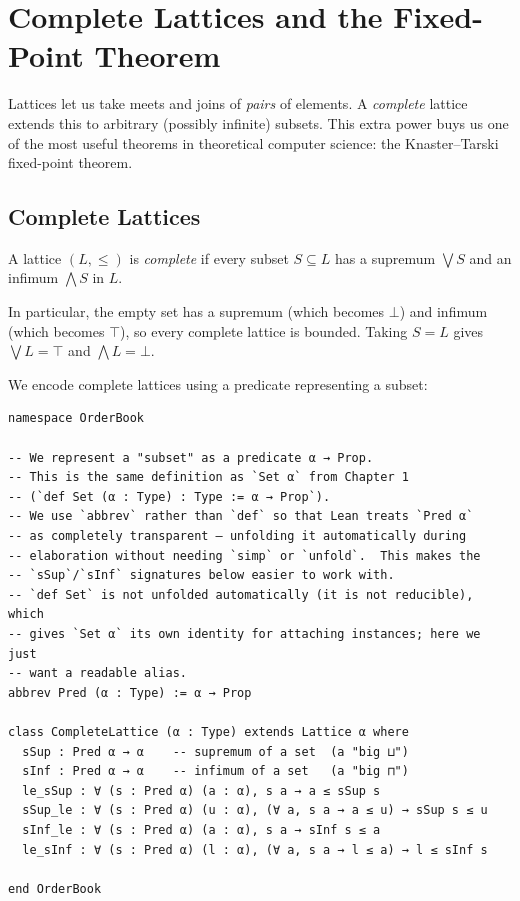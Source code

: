 \documentclass[12pt, a4paper, openright]{book}
\theoremstyle{thmstyle}
\theoremstyle{defstyle}
\newenvironment{defbox}[1][]{%
  \begin{tcolorbox}[defbox, title={Definition\ifx\\#1\\\else\ --- #1\fi}]%
}{\end{tcolorbox}}
\newenvironment{notebox}{%
  \begin{tcolorbox}[notebox]%
}{\end{tcolorbox}}
\begin{document}
\chapter{Complete Lattices and the Fixed-Point Theorem}

Lattices let us take meets and joins of \emph{pairs} of elements. A
\emph{complete} lattice extends this to arbitrary (possibly infinite) subsets.
This extra power buys us one of the most useful theorems in theoretical
computer science: the Knaster--Tarski fixed-point theorem.

\section{Complete Lattices}

\begin{defbox}[Complete Lattice]
  A lattice $(L, \leq)$ is \emph{complete} if every subset $S \subseteq L$
  has a supremum $\bigvee S$ and an infimum $\bigwedge S$ in $L$.
\end{defbox}

\begin{notebox}
  In particular, the empty set has a supremum (which becomes $\bot$) and
  infimum (which becomes $\top$), so every complete lattice is bounded.
  Taking $S = L$ gives $\bigvee L = \top$ and $\bigwedge L = \bot$.
\end{notebox}

We encode complete lattices using a predicate representing a subset:

\begin{verbatim}
namespace OrderBook

-- We represent a "subset" as a predicate α → Prop.
-- This is the same definition as `Set α` from Chapter 1
-- (`def Set (α : Type) : Type := α → Prop`).
-- We use `abbrev` rather than `def` so that Lean treats `Pred α`
-- as completely transparent — unfolding it automatically during
-- elaboration without needing `simp` or `unfold`.  This makes the
-- `sSup`/`sInf` signatures below easier to work with.
-- `def Set` is not unfolded automatically (it is not reducible), which
-- gives `Set α` its own identity for attaching instances; here we just
-- want a readable alias.
abbrev Pred (α : Type) := α → Prop

class CompleteLattice (α : Type) extends Lattice α where
  sSup : Pred α → α    -- supremum of a set  (a "big ⊔")
  sInf : Pred α → α    -- infimum of a set   (a "big ⊓")
  le_sSup : ∀ (s : Pred α) (a : α), s a → a ≤ sSup s
  sSup_le : ∀ (s : Pred α) (u : α), (∀ a, s a → a ≤ u) → sSup s ≤ u
  sInf_le : ∀ (s : Pred α) (a : α), s a → sInf s ≤ a
  le_sInf : ∀ (s : Pred α) (l : α), (∀ a, s a → l ≤ a) → l ≤ sInf s

end OrderBook
\end{verbatim}
\end{document}
